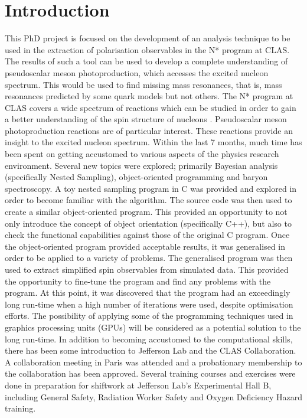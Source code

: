 \documentclass[a4paper,12pt]{article}
\begin{document}
\section{Introduction}
This PhD project is focused on the development of an analysis technique to be used in the extraction of polarisation observables in the N* program at CLAS. The results of such a tool can be used to develop a complete understanding of pseudoscalar meson photoproduction, which accesses the excited nucleon spectrum.  This would be used to find missing mass resonances, that is, mass resonances predicted by some quark models but not others.  The N* program at CLAS covers a wide spectrum of reactions which can be studied in order to gain a better understanding of the spin structure of nucleons \cite{}.  Pseudoscalar meson photoproduction reactions are of particular interest.  These reactions provide an insight to the excited nucleon spectrum.   
\newline
Within the last 7 months, much time has been spent on getting accustomed to various aspects of the physics research environment.  Several new topics were explored; primarily Bayesian analysis (specifically Nested Sampling), object-oriented programming and baryon spectroscopy.  
\newline
A toy nested sampling program in C was provided and explored in order to become familiar with the algorithm.  The source code was then used to create a similar object-oriented program.  This provided an opportunity to not only introduce the concept of object orientation (specifically C++), but also to check the functional capabilities against those of the original C program.  Once the object-oriented program provided acceptable results, it was generalised in order to be applied to a variety of problems.  
\newline
The generalised program was then used to extract simplified spin observables from simulated data. This provided the opportunity to fine-tune the program and find any problems with the program. At this point, it was discovered that the program had an exceedingly long run-time when a high number of iterations were used, despite optimisation efforts.  The possibility of applying some of the programming techniques used in graphics processing units (GPUs) will be considered as a potential solution to the long run-time.
\newline
In addition to becoming accustomed to the computational skills, there has been some introduction to Jefferson Lab and the CLAS Collaboration.  A collaboration meeting in Paris was attended and a probationary membership to the collaboration has been approved.  Several training courses and exercises were done in preparation for shiftwork at Jefferson Lab's Experimental Hall B, including General Safety, Radiation Worker Safety and Oxygen Deficiency Hazard training.  
\end{document}
